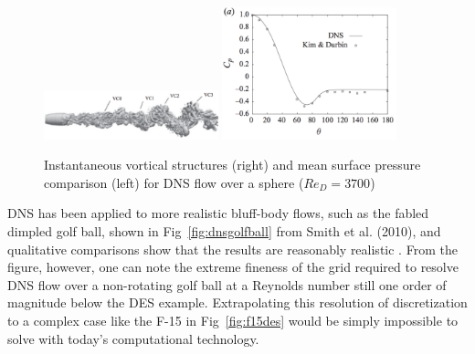 \documentclass[journal]{new-aiaa}
\begin{document}
\begin{figure}[H]
\begin{center}
\includegraphics[width=0.45\textwidth]{Images/logan/rodriguez2011direct_DNSsphereWake.pdf}
\includegraphics[width=0.45\textwidth]{Images/logan/rodriguez2011direct_DNSsphereCp.pdf}
\caption{ Instantaneous vortical structures (right) and mean surface pressure comparison (left) for DNS flow over a sphere ($Re_D = 3700$) \cite{rodriguez2011direct} }
\label{fig:dnssphere}
\end{center}
\end{figure}


DNS has been applied to more realistic bluff-body flows, such as the fabled dimpled golf ball, shown in Fig~\ref{fig:dnsgolfball} from Smith et al. (2010), and qualitative comparisons show that the results are reasonably realistic \cite{smith2010numerical}. From the figure, however, one can note the extreme fineness of the grid required to resolve DNS flow over a non-rotating golf ball at a Reynolds number still one order of magnitude below the DES example. Extrapolating this resolution of discretization to a complex case like the F-15 in Fig~\ref{fig:f15des} would be simply impossible to solve with today's computational technology.
\end{document}
